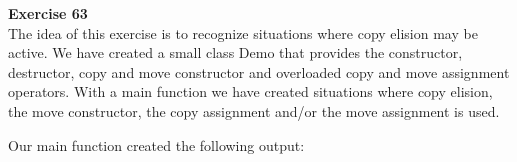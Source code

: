 \textbf{Exercise 63}\\
The idea of this exercise is to recognize situations where copy elision may be active. We have created a small class Demo that provides the constructor, destructor, copy and move constructor and overloaded copy and move assignment operators.
With a main function we have created situations where copy elision, the move constructor, the copy assignment and/or the move assignment is used.






\vspace{10mm}
Our main function created the following output:

